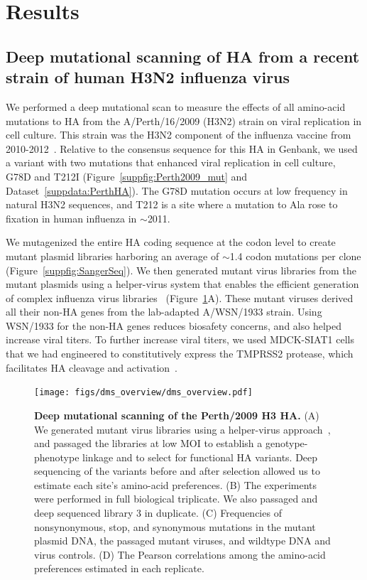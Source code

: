 \documentclass[9pt,twocolumn,twoside]{pnas-new}
\begin{document}
\section*{Results}
\label{sec:results}

\subsection*{Deep mutational scanning of HA from a recent strain of human H3N2 influenza virus}
We performed a deep mutational scan to measure the effects of all amino-acid mutations to HA from the A/Perth/16/2009 (H3N2) strain on viral replication in cell culture. 
This strain was the H3N2 component of the influenza vaccine from 2010-2012~\cite{who2010d,who2011}.
Relative to the consensus sequence for this HA in Genbank, we used a variant with two mutations that enhanced viral replication in cell culture, G78D and T212I (Figure~\ref{suppfig:Perth2009_mut} and Dataset~\ref{suppdata:PerthHA}).
The G78D mutation occurs at low frequency in natural H3N2 sequences, and T212 is a site where a mutation to Ala rose to fixation in human influenza in $\sim$2011.

We mutagenized the entire HA coding sequence at the codon level to create mutant plasmid libraries harboring an average of $\sim$1.4 codon mutations per clone (Figure~\ref{suppfig:SangerSeq}).
We then generated mutant virus libraries from the mutant plasmids using a helper-virus system that enables the efficient generation of complex influenza virus libraries~\cite{doud2016accurate} (Figure~\ref{fig:dms_overview}A).
These mutant viruses derived all their non-HA genes from the lab-adapted A/WSN/1933 strain.
Using WSN/1933 for the non-HA genes reduces biosafety concerns, and also helped increase viral titers.
To further increase viral titers, we used MDCK-SIAT1 cells that we had engineered to constitutively express the TMPRSS2 protease, which facilitates HA cleavage and activation~\cite{bottcher2006proteolytic, bottcher2010cleavage}.

\begin{figure}
\centering
\texttt{[image: figs/dms\_overview/dms\_overview.pdf]}
\caption{\label{fig:dms_overview}
{\bf Deep mutational scanning of the Perth/2009 H3 HA.}
(A) We generated mutant virus libraries using a helper-virus approach~\cite{doud2016accurate}, and passaged the libraries at low MOI to establish a genotype-phenotype linkage and to select for functional HA variants. 
Deep sequencing of the variants before and after selection allowed us to estimate each site's amino-acid preferences.
(B) The experiments were performed in full biological triplicate. 
We also passaged and deep sequenced library 3 in duplicate.
(C) Frequencies of nonsynonymous, stop, and synonymous mutations in the mutant plasmid DNA, the passaged mutant viruses, and wildtype DNA and virus controls. 
(D) The Pearson correlations among the amino-acid preferences estimated in each replicate. 
}
\end{figure}
\end{document}

